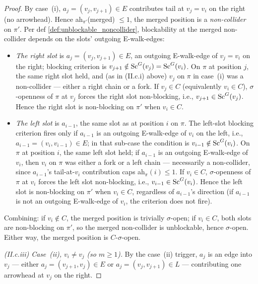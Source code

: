 \begin{Lem}[LabelRoman]
\begin{proof}
By case~(i), $a_j = (v_j, v_{j+1}) \in E$ contributes tail at $v_j = v_i$ on the right (no arrowhead). Hence ah$_{\pi'}$(merged) $\le 1$, the merged position is a \emph{non-collider} on $\pi'$. Per def \ref{def:unblockable_noncollider}, blockability at the merged non-collider depends on the slots' outgoing E-walk-edges:
\begin{itemize}
    \item \emph{The right slot} is $a_j = (v_j, v_{j+1}) \in E$, an outgoing E-walk-edge of $v_j = v_i$ on the right; blocking criterion is $v_{j+1} \notin \mathrm{Sc}^G(v_j) = \mathrm{Sc}^G(v_i)$. On $\pi$ at position $j$, the same right slot held, and (as in (II.c.i) above) $v_j$ on $\pi$ in case~(i) was a non-collider — either a right chain or a fork. If $v_j \in C$ (equivalently $v_i \in C$), $\sigma$-openness of $\pi$ at $v_j$ forces the right slot non-blocking, i.e., $v_{j+1} \in \mathrm{Sc}^G(v_j)$. Hence the right slot is non-blocking on $\pi'$ when $v_i \in C$.
    \item \emph{The left slot} is $a_{i-1}$, the same slot as at position $i$ on $\pi$. The left-slot blocking criterion fires only if $a_{i-1}$ is an outgoing E-walk-edge of $v_i$ on the left, i.e., $a_{i-1} = (v_i, v_{i-1}) \in E$; in that sub-case the condition is $v_{i-1} \notin \mathrm{Sc}^G(v_i)$. On $\pi$ at position $i$, the same left slot held; if $a_{i-1}$ is an outgoing E-walk-edge of $v_i$, then $v_i$ on $\pi$ was either a fork or a left chain — necessarily a non-collider, since $a_{i-1}$'s tail-at-$v_i$ contribution caps ah$_\pi(i) \le 1$. If $v_i \in C$, $\sigma$-openness of $\pi$ at $v_i$ forces the left slot non-blocking, i.e., $v_{i-1} \in \mathrm{Sc}^G(v_i)$. Hence the left slot is non-blocking on $\pi'$ when $v_i \in C$, regardless of $a_{i-1}$'s direction (if $a_{i-1}$ is not an outgoing E-walk-edge of $v_i$, the criterion does not fire).
\end{itemize}
Combining: if $v_i \notin C$, the merged position is trivially $\sigma$-open; if $v_i \in C$, both slots are non-blocking on $\pi'$, so the merged non-collider is unblockable, hence $\sigma$-open. Either way, the merged position is $C$-$\sigma$-open.

\smallskip\noindent\emph{(II.c.iii) Case~(ii), $v_i \ne v_j$ (so $m \ge 1$).}
By the case~(ii) trigger, $a_j$ is an edge into $v_j$ — either $a_j = (v_{j+1}, v_j) \in E$ or $a_j = (v_j, v_{j+1}) \in L$ — contributing one arrowhead at $v_j$ on the right.


\end{proof}
\end{Lem}
